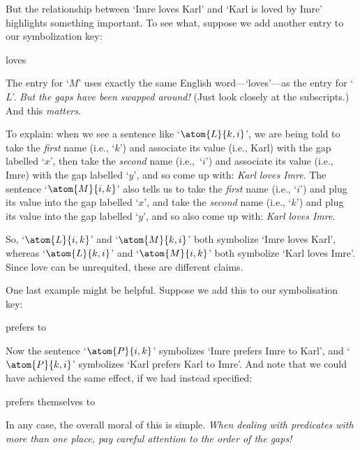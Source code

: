 But the relationship between `Imre loves Karl' and `Karl is loved by Imre' highlights something important. To see what, suppose we add another entry to our symbolization key:
\begin{ekey}
	\item[\atom{M}{x,y}]  loves 
\end{ekey}
The entry for `$M$' uses exactly the same English word---`loves'---as the entry for `$L$'. \emph{But the gaps have been swapped around!} (Just look closely at the subscripts.) And this \emph{matters}.

To explain: when we see a sentence like `$\atom{L}{k,i}$', we are
being told to take the \emph{first} name (i.e., `$k$') and associate
its value (i.e., Karl) with the gap labelled `$x$', then take the
\emph{second} name (i.e.,~`$i$') and associate its value (i.e., Imre)
with the gap labelled `$y$', and so come up with: \emph{Karl loves
Imre}. The sentence `$\atom{M}{i,k}$' also tells us to take the
\emph{first} name (i.e., `$i$') and plug its value into the gap
labelled `$x$', and take the \emph{second} name (i.e., `$k$') and plug
its value into the gap labelled `$y$', and so also come up with:
\emph{Karl loves Imre}.

So, `$\atom{L}{i,k}$' and `$\atom{M}{k,i}$' both symbolize `Imre loves Karl', whereas `$\atom{L}{k,i}$' and `$\atom{M}{i,k}$' both symbolize `Karl loves Imre'. Since love can be unrequited, these are different claims.

One last example might be helpful. Suppose we add this to our symbolisation key: 
\begin{ekey}
	\item[\atom{P}{x,y}]  prefers  to 
\end{ekey}
Now the sentence `$\atom{P}{i,k}$' symbolizes `Imre prefers Imre to Karl', and `$\atom{P}{k,i}$' symbolizes `Karl prefers Karl to Imre'.  And note that we could have achieved the same effect, if we had instead specified:
\begin{ekey}
	\item[\atom{P}{x,y}]  prefers themselves to 
\end{ekey}
In any case, the overall moral of this is simple. \emph{When dealing with predicates with more than one place, pay careful attention to the order of the gaps!} 


